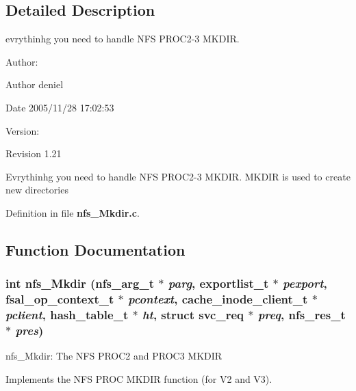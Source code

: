 \subsection{Detailed Description}
evrythinhg you need to handle NFS PROC2-3 MKDIR. 

\begin{Desc}
\item[Author:]\begin{Desc}
\item[Author]deniel \end{Desc}
\begin{Desc}
\item[Date]2005/11/28 17:02:53 \end{Desc}
\end{Desc}
\begin{Desc}
\item[Version:]\begin{Desc}
\item[Revision]1.21 \end{Desc}
\end{Desc}
Evrythinhg you need to handle NFS PROC2-3 MKDIR. MKDIR is used to create new directories

Definition in file {\bf nfs\_\-Mkdir.c}.

\subsection{Function Documentation}
\subsubsection{\setlength{\rightskip}{0pt plus 5cm}int nfs\_\-Mkdir (nfs\_\-arg\_\-t $\ast$ {\em parg}, exportlist\_\-t $\ast$ {\em pexport}, fsal\_\-op\_\-context\_\-t $\ast$ {\em pcontext}, cache\_\-inode\_\-client\_\-t $\ast$ {\em pclient}, hash\_\-table\_\-t $\ast$ {\em ht}, struct svc\_\-req $\ast$ {\em preq}, nfs\_\-res\_\-t $\ast$ {\em pres})}\label{nfs__Mkdir_8c_a0}


nfs\_\-Mkdir: The NFS PROC2 and PROC3 MKDIR

Implements the NFS PROC MKDIR function (for V2 and V3).

